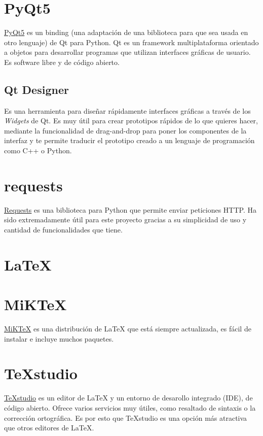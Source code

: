 \section{PyQt5}

\href{https://doc.qt.io/qtforpython/}{PyQt5} es un binding (una adaptación de una biblioteca para que sea usada en otro lenguaje) de Qt para Python. Qt es un framework multiplataforma orientado a objetos para desarrollar programas que utilizan interfaces gráficas de usuario. Es software libre y de código abierto.

\subsection{Qt Designer}
Es una herramienta para diseñar rápidamente interfaces gráficas a través de los \textit{Widgets} de Qt. Es muy útil para crear prototipos rápidos de lo que quieres hacer, mediante la funcionalidad de drag-and-drop para poner los componentes de la interfaz y te permite traducir el prototipo creado a un lenguaje de programación como C++ o Python.

\section{requests}

\href{https://requests.readthedocs.io/es/latest/}{Requests} es una biblioteca para Python que permite enviar peticiones HTTP. Ha sido extremadamente útil para este proyecto gracias a su simplicidad de uso y cantidad de funcionalidades que tiene.

\section{LaTeX}

\section{MiKTeX}

\href{https://miktex.org/}{MiKTeX} es una distribución de LaTeX que está siempre actualizada, es fácil de instalar e incluye muchos paquetes.

\section{TeXstudio}

\href{https://www.texstudio.org/}{TeXstudio} es un editor de LaTeX y un entorno de desarollo integrado (IDE), de código abierto. Ofrece varios servicios muy útiles, como resaltado de sintaxis	o la corrección ortográfica. Es por esto que TeXstudio es una opción más atractiva que otros editores de LaTeX.

